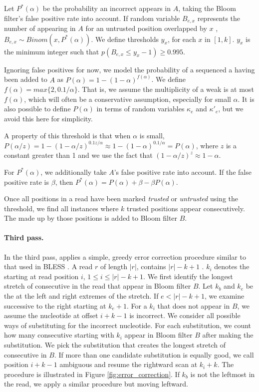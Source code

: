 \documentclass{bmcart}
\begin{document}
Let $P^*(\alpha)$ be the probability an incorrect \kmer appears in $A$, taking the Bloom filter's false positive rate into account.  If random variable $B_{e,x}$ represents the number of \kmers appearing in $A$ for an untrusted position overlapped by $x$ \kmers, $B_{e,x} \sim Binom(x,P^*(\alpha))$.  We define thresholds $y_x$, for each $x$ in $[1, k]$.  $y_x$ is the minimum integer such that $p(B_{e,x}\le y_x - 1)\ge 0.995$.

Ignoring false positives for now, we model the probability of a sequenced a \kmer having been added to $A$ as $P(\alpha)=1-(1-\alpha)^{f(\alpha)}$.  We define $f(\alpha)=max\{2,0.1/\alpha\}$.  That is, we assume the multiplicity of a weak \kmer is at most $f(\alpha)$, which will often be a conservative assumption, especially for small $\alpha$.  It is also possible to define $P(\alpha)$ in terms of random variables $\kappa_e$ and $\kappa'_e$, but we avoid this here for simplicity.

A property of this threshold is that when $\alpha$ is small, $P(\alpha/z)=1-(1-\alpha/z)^{0.1z/\alpha}\approx 1-(1-\alpha)^{0.1/\alpha}=P(\alpha)$, where $z$ is a constant greater than 1 and we use the fact that $(1-\alpha/z)^z\approx 1-\alpha$.

For $P^*(\alpha)$, we additionally take $A$'s false positive rate into account.  If the false positive rate is $\beta$, then $P^*(\alpha)=P(\alpha)+\beta-\beta P(\alpha)$.

Once all positions in a read have been marked \emph{trusted} or \emph{untrusted} using the threshold, we find all instances where $k$ trusted positions appear consecutively.  The \kmer made up by those positions is added to Bloom filter $B$.

\paragraph{Third pass.} 
In the third pass, \tool applies a simple, greedy error correction procedure similar to that used in BLESS \cite{heo2014bless}.
A read $r$ of length $|r|$, contains $|r|-k+1$ \kmers.
$k_i$ denotes the \kmer starting at read position $i$, $1\le i\le|r|-k+1$.
We first identify the longest stretch of consecutive \kmers in the read that appear in Bloom filter $B$.
Let $k_b$ and $k_e$ be the \kmers at the left and right extremes of the stretch.
If $e < |r|-k+1$, we examine successive \kmers to the right starting at $k_e+1$.
For a \kmer $k_i$ that does not appear in $B$, we assume the nucleotide at offset $i+k-1$ is incorrect.
We consider all possible ways of substituting for the incorrect nucleotide.
For each substitution, we count how many consecutive \kmers starting with $k_i$ appear in Bloom filter $B$ after making the substitution.
We pick the substitution that creates the longest stretch of consecutive \kmers in $B$.
If more than one candidate substitution is equally good, we call position $i+k-1$ ambiguous and resume the rightward scan at \kmer $k_i+k$.
The procedure is illustrated in Figure \ref{fig:error_correction}.  If $k_b$ is not the leftmost \kmer in the read, we apply a similar procedure but moving leftward.
\end{document}
